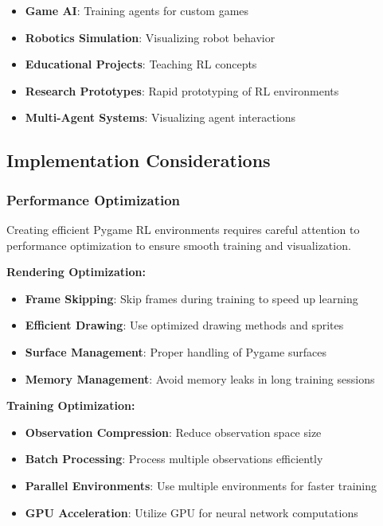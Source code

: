 \documentclass[12pt]{article}
\begin{document}
{{{\begin{itemize}
    \item \textbf{Game AI}: Training agents for custom games
    \item \textbf{Robotics Simulation}: Visualizing robot behavior
    \item \textbf{Educational Projects}: Teaching RL concepts
    \item \textbf{Research Prototypes}: Rapid prototyping of RL environments
    \item \textbf{Multi-Agent Systems}: Visualizing agent interactions
\end{itemize}

\subsection{Implementation Considerations}

\subsubsection{Performance Optimization}

Creating efficient Pygame RL environments requires careful attention to performance optimization to ensure smooth training and visualization.

\textbf{Rendering Optimization:}
\begin{itemize}
    \item \textbf{Frame Skipping}: Skip frames during training to speed up learning
    \item \textbf{Efficient Drawing}: Use optimized drawing methods and sprites
    \item \textbf{Surface Management}: Proper handling of Pygame surfaces
    \item \textbf{Memory Management}: Avoid memory leaks in long training sessions
\end{itemize}

\textbf{Training Optimization:}
\begin{itemize}
    \item \textbf{Observation Compression}: Reduce observation space size
    \item \textbf{Batch Processing}: Process multiple observations efficiently
    \item \textbf{Parallel Environments}: Use multiple environments for faster training
    \item \textbf{GPU Acceleration}: Utilize GPU for neural network computations
\end{itemize}

}}}
\end{document}
